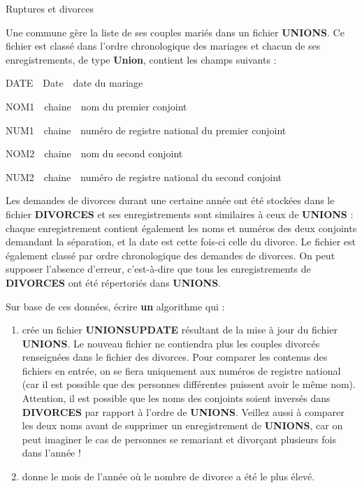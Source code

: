 \begin{Exercice}{Ruptures et divorces}

Une commune gère la liste de ses couples mariés dans un fichier \textbf{UNIONS}.
Ce fichier est classé dans l’ordre chronologique des mariages 
et chacun de ses enregistrements, de type \textbf{Union},
contient les champs suivants :

\begin{liste}
\item {
DATE\ \ Date\ \ date du mariage}
\item {
NOM1\ \ chaine\ \ nom du premier conjoint}
\item {
NUM1\ \ chaine\ \ numéro de registre national du premier conjoint}
\item {
NOM2\ \ chaine\ \ nom du second conjoint}
\item {
NUM2\ \ chaine\ \ numéro de registre national du second conjoint}
\end{liste}
{
{Les demandes de divorces durant une certaine
année ont été stockées dans le fichier
}{\textbf{DIVORCES}}{
et ses enregistrements sont similaires à ceux de
}{\textbf{UNIONS}}{ :
chaque enregistrement contient également les noms et numéros des deux
conjoints demandant la séparation, et la date est cette fois-ci celle
du divorce. Le fichier est également classé par ordre chronologique des
demandes de divorces. On peut supposer l’absence d’erreur, c’est-à-dire
que tous les enregistrements de
}{\textbf{DIVORCES}}{
ont été répertoriés dans
}{\textbf{UNIONS}}{.}}

{
{Sur base de ces données, écrire
}{\textbf{un}}{
algorithme qui :}}

\begin{enumerate}
\item {
{crée un fichier
}{\textbf{UNIONSUPDATE}}{
résultant de la mise à jour du fichier
}{\textbf{UNIONS}}{. Le
nouveau fichier ne contiendra plus les couples divorcés renseignées
dans le fichier des divorces. Pour comparer les contenus des fichiers
en entrée, on se fiera uniquement aux numéros de registre national (car
il est possible que des personnes différentes puissent avoir le même
nom). Attention, il est possible que les noms des conjoints soient
inversés dans
}{\textbf{DIVORCES}}{
par rapport à l’ordre de
}{\textbf{UNIONS}}{.
Veillez aussi à comparer les deux noms avant de supprimer un
enregistrement de
}{\textbf{UNIONS}}{,
car on peut imaginer le cas de personnes se remariant et divorçant
plusieurs fois dans l’année !}}
\item {
donne le mois de l’année où le nombre de divorce a été le plus élevé.}
\end{enumerate}

\end{Exercice}

